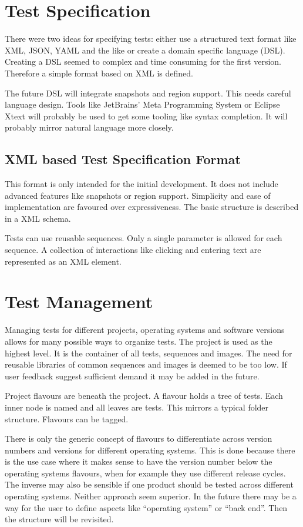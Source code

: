 \documentclass[a4paper,twocolumn]{article}
\begin{document}
\section{Test Specification}
There were two ideas for specifying tests: either use a structured text format like XML, JSON, YAML and the like or create a domain specific language (DSL).
Creating a DSL seemed to complex and time consuming for the first version.
Therefore a simple format based on XML is defined.

The future DSL will integrate snapshots and region support.
This needs careful language design.
Tools like JetBrains' Meta Programming System\cite{MPS}
or Eclipse Xtext\cite{Xtext} will probably be used to get some tooling like syntax completion.
It will probably mirror natural language more closely.

\subsection{XML based Test Specification Format}
This format is only intended for the initial development.
It does not include advanced features like snapshots or region support.
Simplicity and ease of implementation are favoured over expressiveness.
The basic structure is described in a XML schema.

Tests can use reusable sequences.
Only a single parameter is allowed for each sequence.
A collection of interactions like clicking and entering text are represented as an XML element.


\section{Test Management}
Managing tests for different projects, operating systems and software versions allows for many possible ways to organize tests.
The project is used as the highest level.
It is the container of all tests, sequences and images.
The need for reusable libraries of common sequences and images is deemed to be too low.
If user feedback suggest sufficient demand it may be added in the future.

Project flavours are beneath the project.
A flavour holds a tree of tests.
Each inner node is named and all leaves are tests.
This mirrors a typical folder structure.
Flavours can be tagged.

There is only the generic concept of flavours to differentiate across version numbers and versions for different operating systems.
This is done because there is the use case where it makes sense to have the version number below the operating systems flavours, when for example they use different release cycles.
The inverse may also be sensible if one product should be tested across different operating systems.
Neither approach seem superior.
In the future there may be a way for the user to define aspects like \enquote{operating system} or \enquote{back end}. Then the structure will be revisited.
\end{document}
